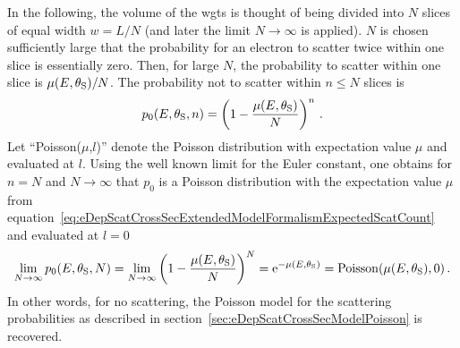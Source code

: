 In the following, the volume of the \gls{wgts} is thought of being divided into $N$ slices of equal width $w=L/N$ (and later the limit $N\rightarrow\infty$ is applied). $N$ is chosen sufficiently large that the probability for an electron to scatter twice within one slice is essentially zero. Then, for large $N$, the probability to scatter within one slice is $\mu(E,\theta_\mathrm{S})/N$. The probability not to scatter within $n \leq N$ slices is
\begin{equation}
p_0(E,\theta_\mathrm{S},n) =
\left(
1-\frac{\mu(E,\theta_\mathrm{S})}{N}
\right)^n
\text{\,.}
\end{equation}
Let ``Poisson($\mu$,$l$)'' denote the Poisson distribution with expectation value $\mu$ and evaluated at $l$. Using the well known limit for the Euler constant, one obtains for $n=N$ and $N\rightarrow\infty$ that $p_0$ is a Poisson distribution with the expectation value $\mu$ from equation~\eqref{eq:eDepScatCrossSecExtendedModelFormalismExpectedScatCount} and evaluated at $l=0$ 
\begin{align}
\label{eq:eDepScatCrossSecExtendedModelFormalismRecoveryOfPoisson}
\lim_{N\rightarrow\infty} 
p_0(E,\theta_\mathrm{S},N) =
\lim_{N\rightarrow\infty} 
\left(
1-\frac{\mu(E,\theta_\mathrm{S})}{N}
\right)^N =
\mathrm{e}^{-\mu(E,\theta_\mathrm{S})} = 
\mathrm{Poisson}(\mu(E,\theta_\mathrm{S}), 0)
\text{\,.}
\end{align}
In other words, for no scattering, the Poisson model for the scattering probabilities as described in section~\ref{sec:eDepScatCrossSecModelPoisson} is recovered.

